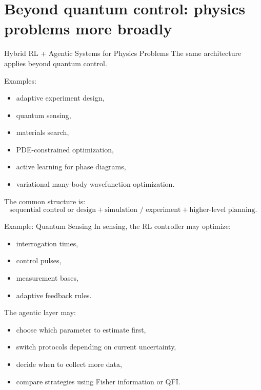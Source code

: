 \documentclass[aspectratio=169]{beamer}
\begin{document}
\section{Beyond quantum control: physics problems more broadly}

\begin{frame}{Hybrid RL + Agentic Systems for Physics Problems}
The same architecture applies beyond quantum control.

Examples:
\begin{itemize}
    \item adaptive experiment design,
    \item quantum sensing,
    \item materials search,
    \item PDE-constrained optimization,
    \item active learning for phase diagrams,
    \item variational many-body wavefunction optimization.
\end{itemize}

The common structure is:
\[
\text{sequential control or design} + \text{simulation / experiment} + \text{higher-level planning}.
\]
\end{frame}

\begin{frame}{Example: Quantum Sensing}
In sensing, the RL controller may optimize:
\begin{itemize}
    \item interrogation times,
    \item control pulses,
    \item measurement bases,
    \item adaptive feedback rules.
\end{itemize}

The agentic layer may:
\begin{itemize}
    \item choose which parameter to estimate first,
    \item switch protocols depending on current uncertainty,
    \item decide when to collect more data,
    \item compare strategies using Fisher information or QFI.
\end{itemize}
\end{frame}
\end{document}
